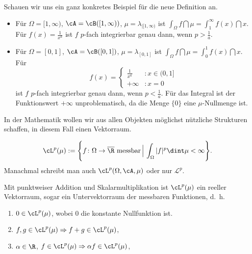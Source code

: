 Schauen wir uns ein ganz konkretes Beispiel f\"ur die neue Definition an. 
\begin{beispiel}  \abs

	\begin{itemize}
		\item Für $\Omega = [1, \infty)$, $\cA = \cB([1,\infty))$, $ \mu = \lambda_{|[1, \infty)}$ ist $ \int_{\Omega} f \dint \mu = \int_{1}^{\infty} f(x)\dint x$. Für $f(x) = \frac{1}{x^a}$ ist $f$ $p$-fach integrierbar genau dann, wenn $p > \frac{1}{a}$.
		\item Für $\Omega = [0, 1]$, $\cA = \cB([0, 1])$, $ \mu = \lambda_{[0, 1]}$ ist $ \int_{\Omega} f \dint \mu = \int_{0}^{1} f(x)\dint x$. Für 
		\[ f(x) = \begin{cases}
		\frac{1}{x^a}&:x \in (0,1]\\
		+ \infty&:x = 0
		\end{cases} \]
		ist $f$ $p$-fach integrierbar genau dann, wenn $p < \frac{1}{a}$. F\"ur das Integral ist der Funktionswert $+\infty$ unproblematisch, da die Menge $\{0\}$ eine $\mu$-Nullmenge ist.
	\end{itemize}
\end{beispiel}
In der Mathematik wollen wir aus allen Objekten m\"oglichst n\"utzliche Strukturen schaffen, in diesem Fall einen Vektorraum.
\begin{deff}
	\[ \cL^p(\mu) := \Bigg\{ f \colon \Omega \to \overline{\R}\text{ messbar}\, \Big|\, \int_{\Omega} |f|^p \dint \mu < \infty \Bigg\}. \]
	Manachmal schreibt man auch $\cL^p(\Omega, \cA, \mu)$ oder nur $\mathcal L^p$.
\end{deff}

\begin{lemma}
	Mit punktweiser Addition und Skalarmultiplikation ist $\cL^p(\mu)$ ein reeller Vektorraum, sogar ein Untervektorraum der messbaren Funktionen, \mbox{d. h.} 
	\begin{enumerate}[label=(\roman*)]
		\item\label{uvr2} $0 \in \cL^p(\mu)$, wobei $0$ die konstante Nullfunktion ist.
		\item\label{uvr1} $f,g \in \cL^p(\mu) \Rightarrow f+g \in \cL^p(\mu)$,
		\item $\alpha \in \R$, $f \in \cL^p(\mu) \Rightarrow \alpha f \in \cL^p(\mu)$,
	\end{enumerate}
\end{lemma}

